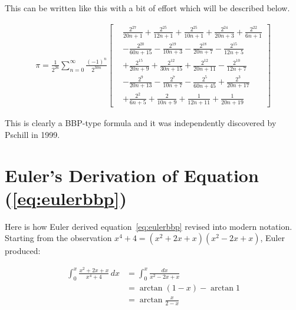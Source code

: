 \documentclass[11pt]{article}
\begin{document}
This can be written like this with a bit of effort which will be described below.

\begin{equation}  \label{eq:eulerbbp2}
\begin{split}
  \pi
  = \frac{1}{2^{26}} \sum_{n = 0}^\infty \frac{(-1)^n}{2^{30n}} \left[
    \begin{aligned}
    & \frac{2^{27}}{20n+1}
    + \frac{2^{25}}{12n+1}
    + \frac{2^{25}}{10n+1}
    + \frac{2^{24}}{20n+3}
    + \frac{2^{22}}{6n+1} \\
    &- \frac{2^{20}}{60n+15}
    - \frac{2^{19}}{10n+3}
    - \frac{2^{18}}{20n+7}
    - \frac{2^{15}}{12n+5} \\
    &+ \frac{2^{15}}{20n+9}
    + \frac{2^{12}}{30n+15}
    + \frac{2^{12}}{20n+11}
    - \frac{2^{10}}{12n+7} \\
    &- \frac{2^{9}}{20n+13} 
    - \frac{2^{7}}{10n+7}
    - \frac{2^{5}}{60n+45}
    + \frac{2^{3}}{20n+17} \\
    &+ \frac{2^{2}}{6n+5}
    + \frac{2}{10n+9}
    + \frac{1}{12n+11}
    + \frac{1}{20n+19}
    \end{aligned}
  \right]
\end{split}
\end{equation}

This is clearly a BBP-type formula and it was independently discovered by Pschill \cite{Arndt2001} in 1999.

\section{Euler's Derivation of Equation (\ref{eq:eulerbbp})}

Here is how Euler derived equation~\eqref{eq:eulerbbp} revised into modern notation. Starting from the observation $x^4 + 4 = (x^2 + 2x + x)(x^2 - 2x + x)$, Euler produced:

\begin{align}
\int_0^x \frac{x^2 + 2x + x}{x^4 + 4} \,dx \label{eq:integral}
&= \int_0^x \frac{dx}{x^2 - 2x + x} \\
&= \arctan{(1-x)} - \arctan{1} \\
&= \arctan{\frac{x}{2-x}} \label{eq:rhs}
\end{align}


\end{document}
